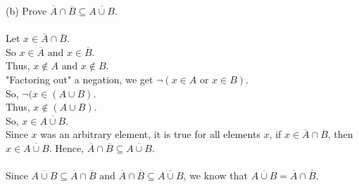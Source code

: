 \documentclass[10pt]{article}
\begin{document}
\begin{enumerate}
    (b) Prove $\overline{A}\cap\overline{B}\subseteq\overline{A\cup B}$. \\
    \\
    Let $x\in\overline{A}\cap\overline{B}$. \\
    So $x\in\overline{A}\text{ and } x\in\overline{B}$. \\
    Thus, $x\notin A \text{ and } x\notin B$. \\
    "Factoring out" a negation, we get $\neg(x\in A \text{ or }x\in B)$. \\
    So, $\neg(x\in(A\cup B)$. \\
    Thus, $x\notin(A\cup B)$. \\
    So, $x\in\overline{A\cup B}$. \\
    Since $x$ was an arbitrary element, it is true for all elements $x$, if $x\in\overline{A}\cap\overline{B}$, then $x\in\overline{A\cup B}$. Hence, $\overline{A}\cap\overline{B}\subseteq\overline{A\cup B}$. \\
    \\
    Since $\overline{A\cup B}\subseteq\overline{A}\cap\overline{B} \text{ and } \overline{A}\cap\overline{B}\subseteq\overline{A\cup B}$, we know that $\overline{A\cup B} = \overline{A}\cap\overline{B}$. \\


\end{enumerate}
\end{document}
